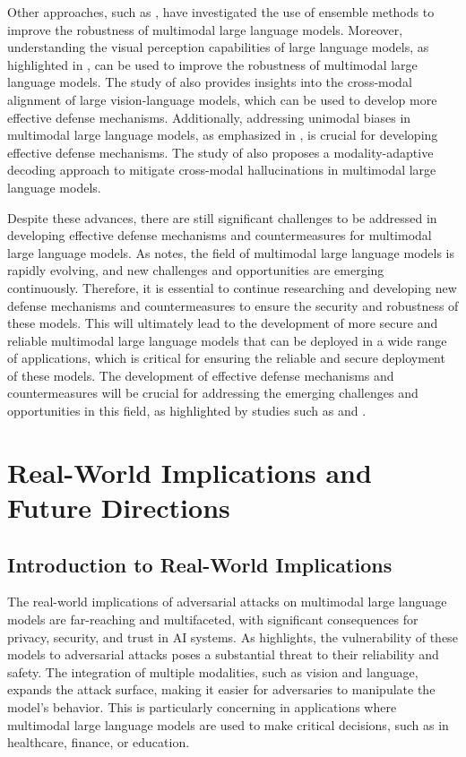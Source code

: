 \documentclass[11pt,a4paper]{article}
\begin{document}
Other approaches, such as \cite{arxiv:2408.15998}, have investigated the use of ensemble methods to improve the robustness of multimodal large language models. Moreover, understanding the visual perception capabilities of large language models, as highlighted in \cite{arxiv:2405.20339}, can be used to improve the robustness of multimodal large language models. The study of \cite{arxiv:2410.07167} also provides insights into the cross-modal alignment of large vision-language models, which can be used to develop more effective defense mechanisms. Additionally, addressing unimodal biases in multimodal large language models, as emphasized in \cite{arxiv:2403.18346}, is crucial for developing effective defense mechanisms. The study of \cite{arxiv:2601.21181} also proposes a modality-adaptive decoding approach to mitigate cross-modal hallucinations in multimodal large language models.

Despite these advances, there are still significant challenges to be addressed in developing effective defense mechanisms and countermeasures for multimodal large language models. As \cite{arxiv:2409.18991} notes, the field of multimodal large language models is rapidly evolving, and new challenges and opportunities are emerging continuously. Therefore, it is essential to continue researching and developing new defense mechanisms and countermeasures to ensure the security and robustness of these models. This will ultimately lead to the development of more secure and reliable multimodal large language models that can be deployed in a wide range of applications, which is critical for ensuring the reliable and secure deployment of these models. The development of effective defense mechanisms and countermeasures will be crucial for addressing the emerging challenges and opportunities in this field, as highlighted by studies such as \cite{arxiv:2402.00357} and \cite{arxiv:2410.19925}.


\section{Real-World Implications and Future Directions}



\subsection{Introduction to Real-World Implications}


The real-world implications of adversarial attacks on multimodal large language models are far-reaching and multifaceted, with significant consequences for privacy, security, and trust in AI systems. As \cite{doi:10.1109/iccvw60793.2023.00395} highlights, the vulnerability of these models to adversarial attacks poses a substantial threat to their reliability and safety. The integration of multiple modalities, such as vision and language, expands the attack surface, making it easier for adversaries to manipulate the model's behavior. This is particularly concerning in applications where multimodal large language models are used to make critical decisions, such as in healthcare, finance, or education.
\end{document}
